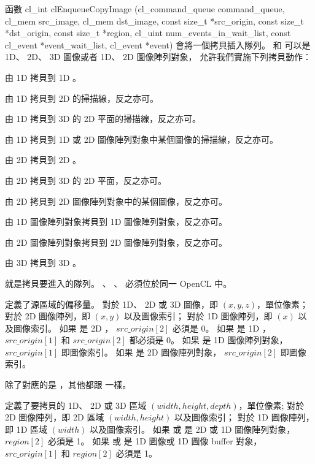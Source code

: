 函數
\startclc
cl_int clEnqueueCopyImage (cl_command_queue command_queue,
			cl_mem src_image,
			cl_mem dst_image,
			const size_t *src_origin,
			const size_t *dst_origin,
			const size_t *region,
			cl_uint num_events_in_wait_list,
			const cl_event *event_wait_list,
			cl_event *event)
\stopclc
會將一個拷貝插入隊列。
  和  可以是 1D、 2D、 3D 圖像或者 1D、 2D 圖像陣列對象，
允許我們實施下列拷貝動作：
\startigBase
\item 由 1D 拷貝到 1D 。
\item 由 1D 拷貝到 2D  的掃描線，反之亦可。
\item 由 1D 拷貝到 3D  的 2D 平面的掃描線，反之亦可。
\item 由 1D 拷貝到 1D 或 2D 圖像陣列對象中某個圖像的掃描線，反之亦可。
\item 由 2D 拷貝到 2D 。
\item 由 2D 拷貝到 3D  的 2D 平面，反之亦可。
\item 由 2D 拷貝到 2D 圖像陣列對象中的某個圖像，反之亦可。
\item 由 1D 圖像陣列對象拷貝到 1D 圖像陣列對象，反之亦可。
\item 由 2D 圖像陣列對象拷貝到 2D 圖像陣列對象，反之亦可。
\item 由 3D 拷貝到 3D 。
\stopigBase

 就是拷貝要進入的隊列。
、 、  必須位於同一 OpenCL 中。

 定義了源區域的偏移量。
對於 1D、 2D 或 3D 圖像，即 $(x, y, z)$，單位像素；
對於 2D 圖像陣列，即 $(x, y)$ 以及圖像索引；
對於 1D 圖像陣列，即 $(x)$ 以及圖像索引。
如果  是 2D ， $src\_origin[2]$ 必須是 0。
如果  是 1D ，$src\_origin[1]$ 和 $src\_origin[2]$ 都必須是 0。
如果  是 1D 圖像陣列對象， $src\_origin[1]$ 即圖像索引。
如果  是 2D 圖像陣列對象， $src\_origin[2]$ 即圖像索引。

 除了對應的是 ，其他都跟  一樣。

 定義了要拷貝的 1D、 2D 或 3D 區域 $(width, height, depth)$，單位像素;
對於 2D 圖像陣列，即 2D 區域 $(width, height)$ 以及圖像索引；
對於 1D 圖像陣列，即 1D 區域 $(width)$ 以及圖像索引。
如果  或  是 2D  或 1D 圖像陣列對象， $region[2]$ 必須是 1。
如果  或  是 1D 圖像或 1D 圖像 buffer 對象， $src\_origin[1]$ 和 $region[2]$ 必須是 1。

